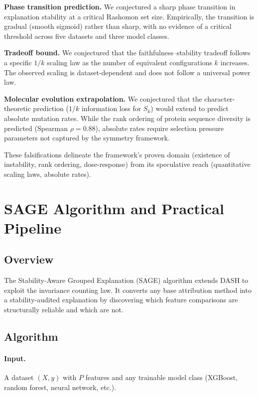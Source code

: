 \documentclass[11pt]{article}
\begin{document}
\textbf{Phase transition prediction.}  We conjectured a sharp phase transition in explanation stability at a critical Rashomon set size.  Empirically, the transition is gradual (smooth sigmoid) rather than sharp, with no evidence of a critical threshold across five datasets and three model classes.

\textbf{Tradeoff bound.}  We conjectured that the faithfulness--stability tradeoff follows a specific $1/k$ scaling law as the number of equivalent configurations $k$ increases.  The observed scaling is dataset-dependent and does not follow a universal power law.

\textbf{Molecular evolution extrapolation.}  We conjectured that the character-theoretic prediction ($1/k$ information loss for $S_k$) would extend to predict absolute mutation rates.  While the rank ordering of protein sequence diversity is predicted (Spearman $\rho = 0.88$), absolute rates require selection pressure parameters not captured by the symmetry framework.

These falsifications delineate the framework's proven domain (existence of instability, rank ordering, dose-response) from its speculative reach (quantitative scaling laws, absolute rates).

\section{SAGE Algorithm and Practical Pipeline}
\label{sec:sage}

\subsection{Overview}

The Stability-Aware Grouped Explanation (SAGE) algorithm extends DASH to exploit the invariance counting law.  It converts any base attribution method into a stability-audited explanation by discovering which feature comparisons are structurally reliable and which are not.

\subsection{Algorithm}

\paragraph{Input.} A dataset $(X, y)$ with $P$ features and any trainable model class (XGBoost, random forest, neural network, etc.).
\end{document}
